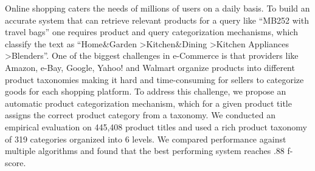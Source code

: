 Online shopping caters the needs of millions of users on a daily basis. To build an accurate system that can retrieve relevant products for a query like ``MB252 with travel bags'' one requires product and query categorization mechanisms, which classify the text as ``Home\&Garden >Kitchen\&Dining >Kitchen Appliances >Blenders''. One of the biggest challenges in e-Commerce is that providers like Amazon, e-Bay, Google, Yahoo! and Walmart organize products into different product taxonomies making it hard and time-consuming for sellers to categorize goods for each shopping platform. To address this challenge, we propose an automatic product categorization mechanism, which for a given product title assigns the correct product category from a taxonomy. We conducted an empirical evaluation on 445,408 product titles and used a rich product taxonomy of 319 categories organized into 6 levels. We compared performance against multiple algorithms and found that the best performing system reaches .88 f-score.
